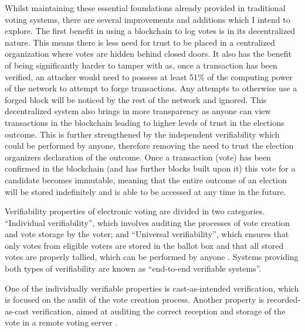 \documentclass{article}
\begin{document}
Whilst maintaining these essential foundations already provided in traditional voting systems, there are several improvements and additions which I intend to explore. The first benefit in using a blockchain to log votes is in its decentralized nature. This means there is less need for trust to be placed in a centralized organization where votes are hidden behind closed doors. It also has the benefit of being significantly harder to tamper with as, once a transaction has been verified, an attacker would need to possess at least 51\% of the computing power of the network to attempt to forge transactions. Any attempts to otherwise use a forged block will be noticed by the rest of the network and ignored. This decentralized system also brings in more transparency as anyone can view transactions in the blockchain leading to higher levels of trust in the elections outcome. This is further strengthened by the independent verifiability which could be performed by anyone, therefore removing the need to trust the election organizers declaration of the outcome. Once a transaction (vote) has been confirmed in the blockchain (and has further blocks built upon it) this vote for a candidate becomes immutable, meaning that the entire outcome of an election will be stored indefinitely and is able to be accessed at any time in the future.

Verifiability properties of electronic voting are divided in two categories. ``Individual verifiability'', which involves auditing the processes of vote creation and vote storage by the voter; and ``Universal verifiability'', which ensures that only votes from eligible voters are stored in the ballot box and that all stored votes are properly tallied, which can be performed by anyone \citep{49_escala_guasch_herranz_morillo_2015}. Systems providing both types of verifiability are known as ``end-to-end verifiable systems''.

One of the individually verifiable properties is cast-as-intended verification, which is focused on the audit of the vote creation process. Another property is recorded-as-cast verification, aimed at auditing the correct reception and storage of the vote in a remote voting server \citep{49_escala_guasch_herranz_morillo_2015}.
\end{document}
